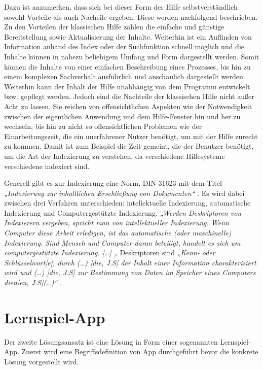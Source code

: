 Dazu ist anzumerken, dass sich bei dieser Form der Hilfe selbstverständlich sowohl Vorteile als auch Nacheile ergeben. Diese werden nachfolgend beschrieben. Zu den Vorteilen der klassischen Hilfe zählen die einfache und günstige Bereitstellung sowie Aktualisierung der Inhalte. Weiterhin ist ein Auffinden von Information anhand des Index oder der Suchfunktion schnell möglich und die Inhalte können in nahezu beliebigem Umfang und Form dargestellt werden. Somit können die Inhalte von einer einfachen Beschreibung eines Prozesses, bis hin zu einem komplexen Sachverhalt ausführlich und anschaulich dargestellt werden. Weiterhin kann der Inhalt der Hilfe unabhängig von dem Programm entwickelt bzw. gepflegt werden. 
Jedoch sind die Nachteile der klassischen Hilfe nicht außer Acht zu lassen. Sie reichen von offensichtlichen Aspekten wie der Notwendigkeit zwischen der eigentlichen Anwendung und dem Hilfe-Fenster hin und her zu wechseln, bis hin zu nicht so offensichtlichen Problemen wie der Einarbeitungszeit, die ein unerfahrener Nutzer benötigt, um mit der Hilfe zurecht zu kommen. Damit ist zum Beispiel die Zeit gemeint, die der Benutzer benötigt, um die Art der Indexierung zu verstehen, da verschiedene Hilfesysteme verschiedene indexiert sind.

Generell gibt es zur Indexierung eine Norm, DIN 31623 mit dem Titel  \textit{„Indexierung zur inhaltlichen Erschließung von Dokumenten“} \cite{dinNorm}. Es wird dabei zwischen drei Verfahren unterschieden: intellektuelle Indexierung, automatische Indexierung und Computergestützte Indexierung. \textit{„Werden Deskriptoren von Indexierern vergeben, spricht man von intellektueller Indexierung. Wenn Computer diese Arbeit erledigen, ist das automatische (oder maschinelle) Indexierung. Sind Mensch und Computer daran beteiligt, handelt es sich um computergestützte Indexierung. […] „} \cite{designingUi} Deskriptoren sind \textit{„Kenn- oder Schlüsselwort[e], durch (…) [die, J.S] der Inhalt einer Information charakterisiert wird und (…) [die, J.S] zur Bestimmung von Daten im Speicher eines Computers dien[en, J.S](…)“} \cite{deskriptor}.


\section{Lernspiel-App}
Der zweite Lösungsansatz ist eine Lösung in Form einer sogenannten Lernspiel-App. Zuerst wird eine Begriffsdefinition von App durchgeführt bevor die konkrete Lösung vorgestellt wird.

